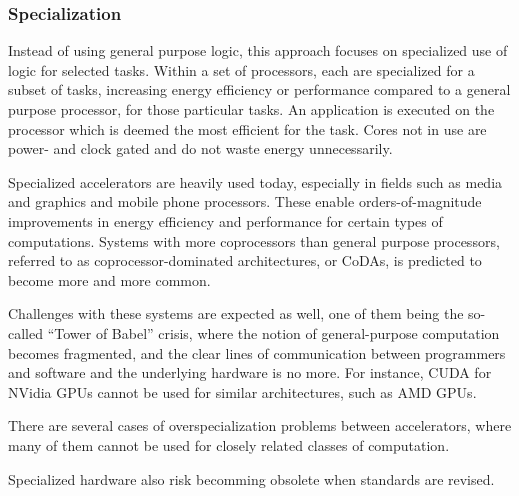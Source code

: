 
\subsubsection{Specialization}
Instead of using general purpose logic, this approach focuses on specialized use of logic for selected tasks.
Within a set of processors, each are specialized for a subset of tasks, increasing energy efficiency or performance compared to a general purpose processor, for those particular tasks.
An application is executed on the processor which is deemed the most efficient for the task.
Cores not in use are power- and clock gated and do not waste energy unnecessarily.

Specialized accelerators are heavily used today, especially in fields such as media and graphics and mobile phone processors.
These enable orders-of-magnitude improvements in energy efficiency and performance for certain types of computations.
Systems with more coprocessors than general purpose processors, referred to as coprocessor-dominated architectures, or CoDAs, is predicted to become more and more common.

Challenges with these systems are expected as well, one of them being the so-called ``Tower of Babel'' crisis, where
the notion of general-purpose computation becomes fragmented, and the clear lines of communication between programmers and software and the underlying hardware is no more.
For instance, CUDA for NVidia GPUs cannot be used for similar architectures, such as AMD GPUs.

There are several cases of overspecialization problems between accelerators, where many of them cannot be used for closely related classes of computation.

Specialized hardware also risk becomming obsolete when standards are revised. \cite{dark-silicon}


